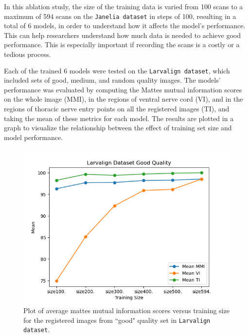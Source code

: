 \documentclass{book}
\begin{document}
	In this ablation study, the size of the training data is varied from 100 scans to a maximum of 594 scans on the \texttt{Janelia dataset} in steps of 100, resulting in a total of 6 models, in order to understand how it affects the model's performance. This can help researchers understand how much data is needed to achieve good performance. This is especially important if recording the scans is a costly or a tedious process.
	
	Each of the trained 6 models were tested on the \texttt{Larvalign dataset}, which included sets of good, medium, and random quality images. The models' performance was evaluated by computing the Mattes mutual information scores on the whole image (MMI), in the regions of ventral nerve cord (VI), and in the regions of thoracic nerve entry points on all the registered images (TI), and taking the mean of these metrics for each model. The results are plotted in a graph to visualize the relationship between the effect of training set size and model performance.
	
	\begin{figure}[h!]
		\centering
		\includegraphics[width=0.9\columnwidth]{resources/ablation_size/size_effect_good.png}
		\caption{Plot of average mattes mutual information scores versus training size for the registered images from ``good" quality set in \texttt{Larvalign dataset}.}
		\label{fig:size_effect_good}
	\end{figure}
\end{document}
